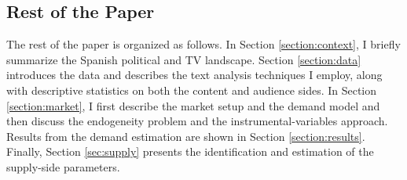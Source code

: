 \documentclass[12pt]{article}
\begin{document}

\subsection*{Rest of the Paper}

The rest of the paper is organized as follows. In Section \ref{section:context}, I briefly summarize the Spanish political and TV landscape. Section \ref{section:data} introduces the data and describes the text analysis techniques I employ, along with descriptive statistics on both the content and audience sides. In Section \ref{section:market}, I first describe the market setup and the demand model and then discuss the endogeneity problem and the instrumental-variables approach. Results from the demand estimation are shown in Section \ref{section:results}. Finally, Section \ref{sec:supply} presents the identification and estimation of the supply-side parameters.
\end{document}
